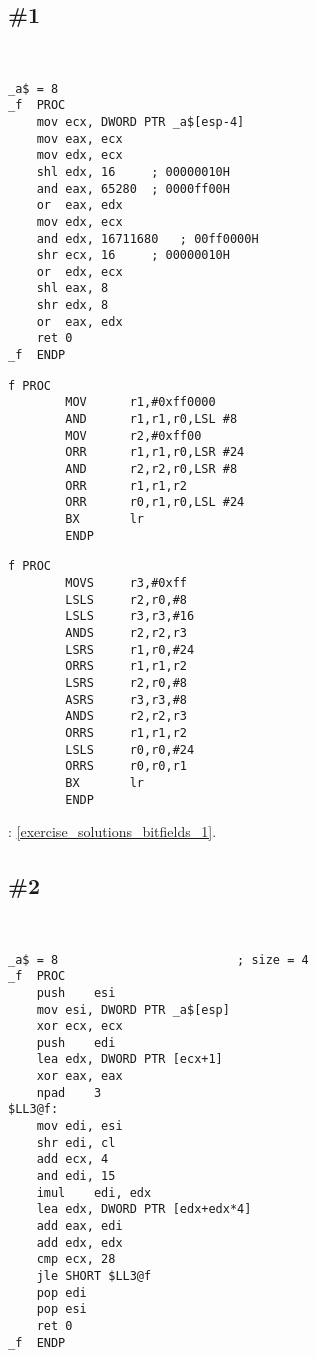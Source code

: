 ﻿\section{\Exercises}

\subsection{\Exercise \#1}
\label{exercise_bitfields_1}

\WhatThisCodeDoes\

\begin{lstlisting}[caption=MSVC 2010 /Ox]
_a$ = 8
_f	PROC
	mov	ecx, DWORD PTR _a$[esp-4]
	mov	eax, ecx
	mov	edx, ecx
	shl	edx, 16		; 00000010H
	and	eax, 65280	; 0000ff00H
	or	eax, edx
	mov	edx, ecx
	and	edx, 16711680	; 00ff0000H
	shr	ecx, 16		; 00000010H
	or	edx, ecx
	shl	eax, 8
	shr	edx, 8
	or	eax, edx
	ret	0
_f	ENDP
\end{lstlisting}

\begin{lstlisting}[caption=\Optimizing{} Keil 5.03 (\ARMMode)]
f PROC
        MOV      r1,#0xff0000
        AND      r1,r1,r0,LSL #8
        MOV      r2,#0xff00
        ORR      r1,r1,r0,LSR #24
        AND      r2,r2,r0,LSR #8
        ORR      r1,r1,r2
        ORR      r0,r1,r0,LSL #24
        BX       lr
        ENDP
\end{lstlisting}

\begin{lstlisting}[caption=\Optimizing{} Keil 5.03 (\ThumbMode)]
f PROC
        MOVS     r3,#0xff
        LSLS     r2,r0,#8
        LSLS     r3,r3,#16
        ANDS     r2,r2,r3
        LSRS     r1,r0,#24
        ORRS     r1,r1,r2
        LSRS     r2,r0,#8
        ASRS     r3,r3,#8
        ANDS     r2,r2,r3
        ORRS     r1,r1,r2
        LSLS     r0,r0,#24
        ORRS     r0,r0,r1
        BX       lr
        ENDP
\end{lstlisting}

\Answer{}: \ref{exercise_solutions_bitfields_1}.

\subsection{\Exercise \#2}
\label{exercise_bitfields_2}

\WhatThisCodeDoes\

\begin{lstlisting}[caption=MSVC 2010 /Ox]
_a$ = 8							; size = 4
_f	PROC
	push	esi
	mov	esi, DWORD PTR _a$[esp]
	xor	ecx, ecx
	push	edi
	lea	edx, DWORD PTR [ecx+1]
	xor	eax, eax
	npad	3
$LL3@f:
	mov	edi, esi
	shr	edi, cl
	add	ecx, 4
	and	edi, 15
	imul	edi, edx
	lea	edx, DWORD PTR [edx+edx*4]
	add	eax, edi
	add	edx, edx
	cmp	ecx, 28
	jle	SHORT $LL3@f
	pop	edi
	pop	esi
	ret	0
_f	ENDP
\end{lstlisting}

